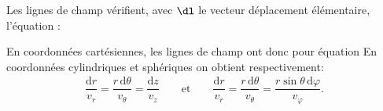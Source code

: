 \documentclass[12pt,fancy]{/Users/victor/Documents/COURS/2ACapECL/texmf/tex/latex/Preambles/cours}
\begin{document}
\begin{prop}\label{prop:}
Les lignes de champ vérifient, avec $\dl$ le vecteur déplacement élémentaire, l'équation :
\begin{center}
\end{center}
\end{prop}
\begin{remarque}
En coordonnées cartésiennes, les lignes de champ ont donc pour équation 
En coordonnées cylindriques et sphériques on obtient respectivement:
\begin{equation*}
\begin{split}
\dfrac{\mathrm{d}r}{v_{r}}=\dfrac{r\,\mathrm{d}\theta}{v_{\theta}}=\dfrac{\mathrm{d}z}{v_{z}}\qquad\text{et}\qquad \dfrac{\mathrm{d}r}{v_{r}}=\dfrac{r\,\mathrm{d}\theta}{v_{\theta}}=\dfrac{r\sin\theta\,\mathrm{d}\varphi}{v_{\varphi}}.
\end{split}
\end{equation*}
\end{remarque}
\end{document}
